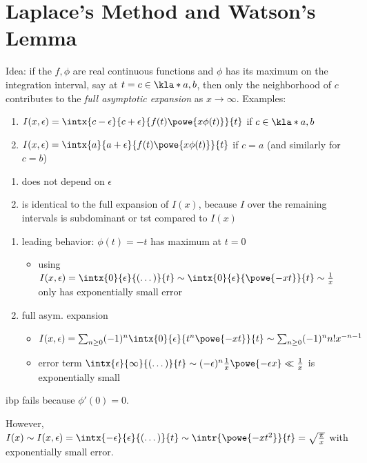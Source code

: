 \documentclass[english, parskip=full]{scrbook}
\newcommand{\definition}[2]{\begin{tcolorbox}[colback=colorbackgrounddefinition,colframe=colordefinition, breakable,enhanced,title=\textbf{#1}.]#2\end{tcolorbox}}
\newcommand{\example}[3]{\begin{tcolorbox}[colback=colorbackgroundexample,colframe=colorexample, breakable,enhanced,title={\textbf{#1}: #2.}]#3\end{tcolorbox}}
\begin{document}
\section{Laplace's Method and Watson's Lemma}
Idea: if the $f,\phi$ are real continuous functions and $\phi$ has its maximum on the integration interval, say at $t=c\in\kla*{a,b}$, then only the neighborhood of $c$ contributes to the \emph{full asymptotic expansion} as $x\rightarrow\infty$.
Examples:
\begin{enumerate}
\item $I(x,\epsilon) = \intx{c-\epsilon}{c+\epsilon}{f(t) \powe{x\phi(t)}}{t}$ if $c\in\kla*{a,b}$
\item $I(x,\epsilon) = \intx{a}{a+\epsilon}{f(t)\powe{x\phi(t)}}{t}$ if $c=a$ (and similarly for $c=b$)
\end{enumerate}
\definition{Full Asymptotic Expansion of $I(x,\epsilon)$ as $x\rightarrow\infty$}{\begin{enumerate}
\item does not depend on $\epsilon$
\item is identical to the full expansion of $I(x)$, because $I$ over the remaining intervals is subdominant or \gls{tst} compared to $I(x)$
\end{enumerate}
}
\example{Stieltjes again}{$\intx{0}{10}{\frac{1}{1+t} \powe{-tx}}{t}$ as $x\rightarrow\infty$}{\begin{enumerate}
\item leading behavior: $\phi(t)=-t$ has maximum at $t=0$
\begin{itemize}
\item using $I(x,\epsilon) = \intx{0}{\epsilon}{(\dots)}{t} \sim \intx{0}{\epsilon}{\powe{-xt}}{t} \sim \frac{1}{x}$ only has exponentially small error 
\end{itemize}
\item full asym. expansion
\begin{itemize}
\item $I(x,\epsilon) = \sum_{n\ge 0} (-1)^n \intx{0}{\epsilon}{t^n \powe{-xt}}{t} \sim \sum_{n\ge 0} (-1)^n n! x^{-n-1}$
\item error term $\intx{\epsilon}{\infty}{(\dots)}{t} \sim (-\epsilon)^n \frac{1}{x} \powe{-\epsilon x} \ll \frac{1}{x}$ is exponentially small
\end{itemize}
\end{enumerate}
}
\example{Error Function}{$\intx{-10}{10}{\powe{-xt^2}}{t}$ as $x\rightarrow\infty$}{\gls{ibp} fails because $\phi'(0)=0$.

However, $I(x) \sim I(x,\epsilon) = \intx{-\epsilon}{\epsilon}{(\dots)}{t} \sim \intr{\powe{-xt^2}}{t} = \sqrt{\frac{\pi}{x}}$ with exponentially small error.
}
\end{document}
